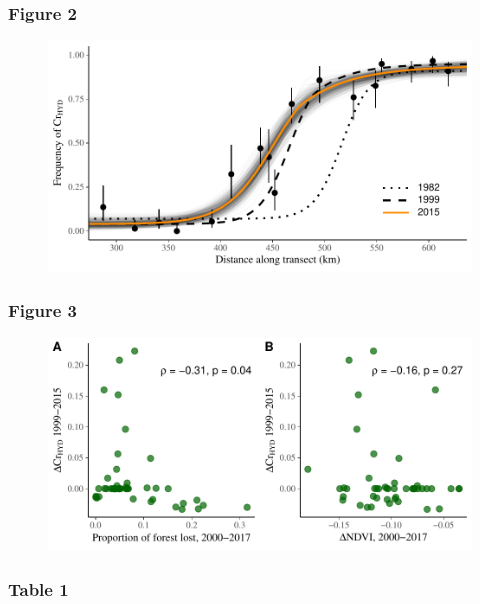 \documentclass[]{article}
\begin{document}
\subsubsection{Figure 2}\label{figure-2}

\begin{figure}[h]
\includegraphics{figure_2}
\end{figure}

\pagebreak

\subsubsection{Figure 3}\label{figure-3}

\begin{figure}[h]
\includegraphics{figure_3}
\end{figure}

\pagebreak

\subsubsection{Table 1}\label{table-1}
\end{document}
